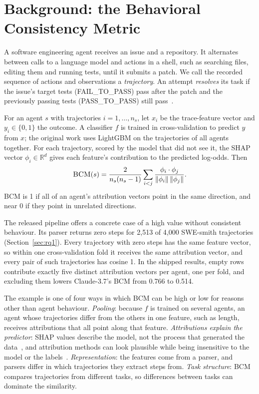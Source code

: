 \documentclass[conference]{IEEEtran}
\newcommand{\bcm}{\textsc{BCM}}
\begin{document}
\section{Background: the Behavioral Consistency Metric}
\label{sec:background}
A software engineering agent receives an issue and a repository. It alternates between calls to a language model and actions in a shell, such as searching files, editing them and running tests, until it submits a patch. We call the recorded sequence of actions and observations a \emph{trajectory}. An attempt \emph{resolves} its task if the issue's target tests (FAIL\_TO\_PASS) pass after the patch and the previously passing tests (PASS\_TO\_PASS) still pass~\cite{jimenez2024swebench}.

For an agent $s$ with trajectories $i=1,\dots,n_s$, let $x_i$ be the trace-feature vector and $y_i\in\{0,1\}$ the outcome. A classifier $f$ is trained in cross-validation to predict $y$ from $x$; the original work uses LightGBM on the trajectories of all agents together. For each trajectory, scored by the model that did not see it, the SHAP vector $\phi_i\in\mathbb{R}^d$ gives each feature's contribution to the predicted log-odds. Then
\[
\bcm(s)=\frac{2}{n_s(n_s-1)}\sum_{i<j}\frac{\phi_i\cdot\phi_j}{\lVert\phi_i\rVert\,\lVert\phi_j\rVert}.
\]
\bcm{} is 1 if all of an agent's attribution vectors point in the same direction, and near 0 if they point in unrelated directions.

The released pipeline offers a concrete case of a high value without consistent behaviour. Its parser returns zero steps for 2{,}513 of 4{,}000 SWE-smith trajectories (Section~\ref{sec:rq1}). Every trajectory with zero steps has the same feature vector, so within one cross-validation fold it receives the same attribution vector, and every pair of such trajectories has cosine 1. In the shipped results, empty rows contribute exactly five distinct attribution vectors per agent, one per fold, and excluding them lowers Claude-3.7's \bcm{} from 0.766 to 0.514.

The example is one of four ways in which \bcm{} can be high or low for reasons other than agent behaviour. \emph{Pooling}: because $f$ is trained on several agents, an agent whose trajectories differ from the others in one feature, such as length, receives attributions that all point along that feature. \emph{Attributions explain the predictor}: SHAP values describe the model, not the process that generated the data~\cite{kumar2020shapproblems}, and attribution methods can look plausible while being insensitive to the model or the labels~\cite{adebayo2018sanity}. \emph{Representation}: the features come from a parser, and parsers differ in which trajectories they extract steps from. \emph{Task structure}: \bcm{} compares trajectories from different tasks, so differences between tasks can dominate the similarity.
\end{document}
